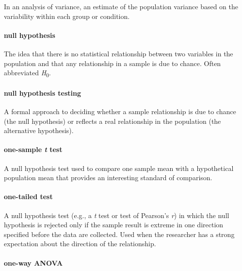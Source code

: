\documentclass[
]{krantz}
\begin{document}
In an analysis of variance, an estimate of the population variance based on the variability within each group or condition.

\paragraph*{null hypothesis}\label{null-hypothesis}

The idea that there is no statistical relationship between two variables in the population and that any relationship in a sample is due to chance. Often abbreviated \emph{H}\textsubscript{0}.

\paragraph*{null hypothesis testing}\label{null-hypothesis-testing}

A formal approach to deciding whether a sample relationship is due to chance (the null hypothesis) or reflects a real relationship in the population (the alternative hypothesis).

\paragraph*{\texorpdfstring{one-sample \emph{t} test}{one-sample t test}}\label{one-sample-t-test-1}

A null hypothesis test used to compare one sample mean with a hypothetical population mean that provides an interesting standard of comparison.

\paragraph*{one-tailed test}\label{one-tailed-test}

A null hypothesis test (e.g., a \emph{t} test or test of Pearson's \emph{r}) in which the null hypothesis is rejected only if the sample result is extreme in one direction specified before the data are collected. Used when the researcher has a strong expectation about the direction of the relationship.

\paragraph*{one-way ANOVA}\label{one-way-anova-1}
\end{document}
